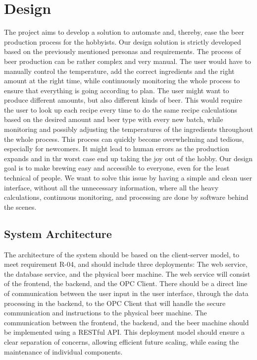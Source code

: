 \section{Design}
The project aims to develop a solution to automate and, thereby, ease the beer production process for the hobbyists. Our design solution is strictly developed based on the previously mentioned personas and requirements.\newline
The process of beer production can be rather complex and very manual. The user would have to manually control the temperature, add the correct ingredients and the right amount at the right time, while continuously monitoring the whole process to ensure that everything is going according to plan.\newline
The user might want to produce different amounts, but also different kinds of beer. This would require the user to look up each recipe every time to do the same recipe calculations based on the desired amount and beer type with every new batch, while monitoring and possibly adjusting the temperatures of the ingredients throughout the whole process.\newline
This process can quickly become overwhelming and tedious, especially for newcomers. It might lead to human errors as the production expands and in thr worst case end up taking the joy out of the hobby.\newline
Our design goal is to make brewing easy and accessible to everyone, even for the least technical of people. We want to solve this issue by having a simple and clean user interface, without all the unnecessary information, where all the heavy calculations, continuous monitoring, and processing are done by software behind the scenes.\newline

\subsection{System Architecture}
The architecture of the system should be based on the client-server model, to meet requirement R-04, and should include three deployments: The web service, the database service, and the physical beer machine. \newline
The web service will consist of the frontend, the backend, and the OPC Client. There should be a direct line of communication between the user input in the user interface, through the data processing in the backend, to the OPC Client that will handle the secure communication and instructions to the physical beer machine. \newline
The communication between the frontend, the backend, and the beer machine should be implemented using a RESTful API. \newline
This deployment model should ensure a clear separation of concerns, allowing efficient future scaling, while easing the maintenance of individual components. \cite{5}

